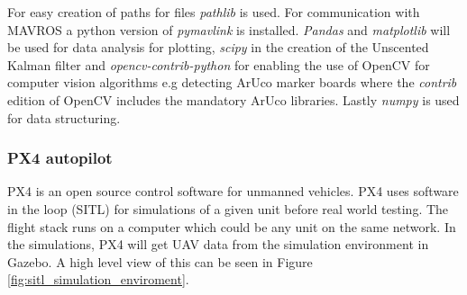 \documentclass[../Head/report.tex]{subfiles}
\begin{document}
For easy creation of paths for files \textit{pathlib} is used. For communication with MAVROS a python version of \textit{pymavlink} is installed. \textit{Pandas} and \textit{matplotlib} will be used for data analysis for plotting, \textit{scipy} in the creation of the Unscented Kalman filter and \textit{opencv-contrib-python} for enabling the use of OpenCV for computer vision algorithms e.g detecting ArUco marker boards where the \textit{contrib} edition of OpenCV includes the  mandatory ArUco libraries. Lastly \textit{numpy} is used for data structuring.      

\subsubsection{PX4 autopilot}
\label{sec:px4_flight_stack}

PX4 is an open source control software for unmanned vehicles. PX4 uses software in the loop (SITL) for simulations of a given unit before real world testing. The flight stack runs on a computer which could be any unit on the same network. In the simulations, PX4 will get UAV data from the simulation environment in Gazebo. A high level view of this can be seen in Figure \ref{fig:sitl_simulation_enviroment}. 
\end{document}
